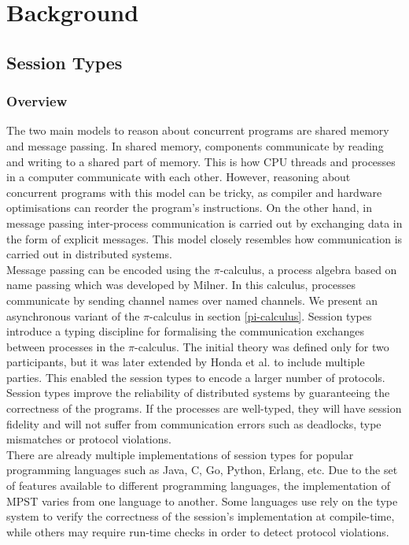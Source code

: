 \documentclass[12pt,twoside]{report}
\begin{document}

\chapter{Background}

\section{Session Types}
\subsection{Overview}

The two main models to reason about concurrent programs are shared memory and message passing. In shared memory, components communicate by reading and writing to a shared part of memory. This is how CPU threads and processes in a computer communicate with each other. However, reasoning about concurrent programs with this model can be tricky, as compiler and hardware optimisations can reorder the program's instructions\cite{sharedmemory}. On the other hand, in message passing inter-process communication is carried out by exchanging data in the form of explicit messages. This model closely resembles how communication is carried out in distributed systems.\\

Message passing can be encoded using the $\pi$-calculus, a process algebra based on name passing which was developed by Milner\cite{milnerpicalc}. In this calculus, processes communicate by sending channel names over named channels. We present an asynchronous variant of the $\pi$-calculus in section \ref{pi-calculus}. Session types\cite{binarysessiontypes1} introduce a typing discipline for formalising the communication exchanges between processes in the $\pi$-calculus. The initial theory was defined only for two participants, but it was later extended by Honda et al.\cite{asyncmpst1, asyncmpst2} to include multiple parties. This enabled the session types to encode a larger number of protocols. Session types improve the reliability of distributed systems by guaranteeing the correctness of the programs. If the processes are well-typed, they will have session fidelity and will not suffer from communication errors such as deadlocks, type mismatches or protocol violations.\\

There are already multiple implementations of session types for popular programming languages such as Java\cite{java}, C\cite{mpstc}, Go\cite{parametrictypes}, Python\cite{python}, Erlang\cite{erlang}, etc. Due to the set of features available to different programming languages, the implementation of MPST varies from one language to another. Some languages use rely on the type system to verify the correctness of the session's implementation at compile-time, while others may require run-time checks in order to detect protocol violations. 
\end{document}

